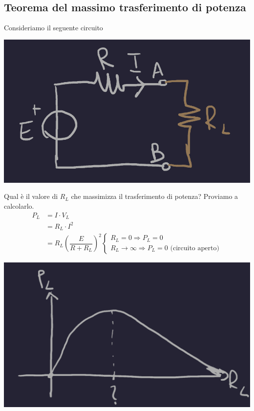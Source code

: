 \documentclass{article}
\begin{document}
\subsection{Teorema del massimo trasferimento di potenza}
Consideriamo il seguente circuito
\begin{center}
    \includegraphics[scale=0.27]{Image/T_Massima_Potenza.png}
\end{center}
Qual è il valore di $R_L$ che massimizza il trasferimento di potenza? Proviamo a calcolarlo.
\begin{align*}
    P_L &= I \cdot V_L\\
    &=R_L \cdot I^2\\
    &=R_L \left( \dfrac{E}{R+R_L} \right)^2 
    \begin{cases}
        R_L=0 \Rightarrow P_L=0\\
        R_L \rightarrow \infty \Rightarrow P_L=0 \text{ (circuito aperto)}
    \end{cases}
\end{align*}
\begin{center}
    \includegraphics[scale=0.25]{Image/T_Potenza_Massima_1.png}
\end{center}
\end{document}
